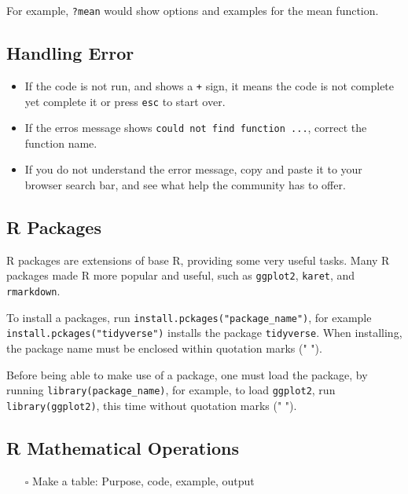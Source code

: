 \documentclass[
]{book}
\providecommand{\tightlist}{%
  \setlength{\itemsep}{0pt}\setlength{\parskip}{0pt}}
\begin{document}
For example, \texttt{?mean} would show options and examples for the mean function.

\hypertarget{handling-error}{%
\subsection{Handling Error}\label{handling-error}}

\begin{itemize}
\tightlist
\item
  If the code is not run, and shows a \texttt{+} sign, it means the code is not complete yet complete it or press \texttt{esc} to start over.
\item
  If the erros message shows \texttt{could\ not\ find\ function\ ...}, correct the function name.
\item
  If you do not understand the error message, copy and paste it to your browser search bar, and see what help the community has to offer.
\end{itemize}

\hypertarget{r-packages}{%
\subsection{R Packages}\label{r-packages}}

R packages are extensions of base R, providing some very useful tasks. Many R packages made R more popular and useful, such as \texttt{ggplot2}, \texttt{karet}, and \texttt{rmarkdown}.

To install a packages, run \texttt{install.pckages("package\_name")}, for example \texttt{install.pckages("tidyverse")} installs the package \texttt{tidyverse}. When installing, the package name must be enclosed within quotation marks (" ").

Before being able to make use of a package, one must load the package, by running \texttt{library(package\_name)}, for example, to load \texttt{ggplot2}, run \texttt{library(ggplot2)}, this time without quotation marks (" ").

\hypertarget{r-mathematical-operations}{%
\subsection{R Mathematical Operations}\label{r-mathematical-operations}}

\begin{itemize}
\tightlist
\item[$\square$]
  Make a table: Purpose, code, example, output
\end{itemize}
\end{document}
